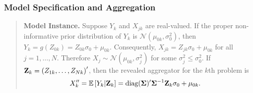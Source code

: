 \documentclass[11pt]{article}
\newcommand{\E}{\mathbb{E}}
\theoremstyle{definition}
\theoremstyle{definition}
\def\bSigma{{\bf \Sigma}}
\def\Z{{\bf Z}}
\def\E{{\mathbb E}}
\def\diag{\text{diag}}
\def\diag{\text{diag}}
\begin{document}
\subsubsection{Model Specification and Aggregation}
\begin{quote}
\textbf{Model Instance.} Suppose $Y_k$ and $X_{jk}$ are real-valued. If the proper non-informative prior distribution of $Y_k$ is $ \mathcal{N}(\mu_{0k}, \sigma_0^2)$, then $Y_k = g(Z_{0k}) = Z_{0k}\sigma_0 + \mu_{0k}$. Consequently, $X_{jk} = Z_{jk}\sigma_0 + \mu_{0k}$ for all $j = 1, \dots, N$. Therefore $X_j \sim \mathcal{N}(\mu_{0k}, \sigma_j^2)$ for some $\sigma_j^2 \leq \sigma_0^2$.  
%
  If $\Z_k = \left(Z_{1k}, \dots, Z_{Nk}\right)'$, then the revealed aggregator for the $k$th problem is 
\begin{align}
X_k'' =  \E\left[Y_k | \Z_k\right] &= \diag(\bSigma)' \bSigma^{-1} \Z_k \sigma_0 + \mu_{0k}. \label{revPoint}
\end{align}
\end{quote}
\end{document}
